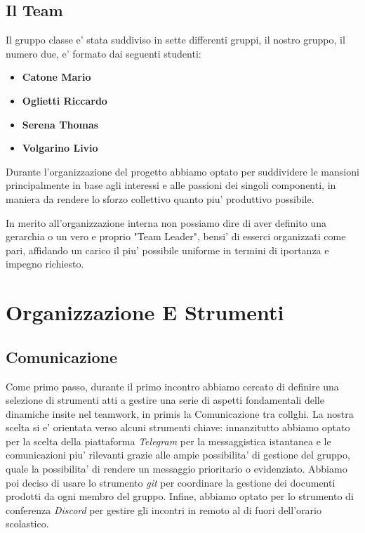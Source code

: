 \documentclass{report}
\begin{document}
		\section{Il Team}
			Il gruppo classe e' stata suddiviso in sette differenti gruppi, il nostro gruppo, il numero due, e' formato dai 
			seguenti studenti:
			\begin{itemize}
				\item \textbf{Catone Mario}
				\item \textbf{Oglietti Riccardo}
				\item \textbf{Serena Thomas}
				\item \textbf{Volgarino Livio}
			\end{itemize}
			Durante l'organizzazione del progetto abbiamo optato per suddividere le mansioni principalmente in base agli
			interessi e alle passioni dei singoli componenti, in maniera da rendere lo sforzo collettivo quanto piu'
			produttivo possibile. 

			In merito all'organizzazione interna non possiamo dire di aver definito una gerarchia o un vero e proprio 
			"Team Leader", bensi' di esserci organizzati come pari, affidando un carico il piu' possibile uniforme in 
			termini di iportanza e impegno richiesto.

	\chapter{Organizzazione E Strumenti}        
		\section{Comunicazione}
			Come primo passo, durante il primo incontro abbiamo cercato di definire una selezione di strumenti atti a 
			gestire una serie di aspetti fondamentali delle dinamiche insite nel teamwork, in primis la Comunicazione
			tra collghi.
			La nostra scelta si e' orientata verso alcuni strumenti chiave: innanzitutto abbiamo optato per la scelta
			della piattaforma \emph{Telegram} per la messaggistica istantanea e le comunicazioni piu' rilevanti grazie
			alle ampie possibilita' di gestione del gruppo, quale la possibilita' di rendere un messaggio prioritario o
			evidenziato. Abbiamo poi deciso di usare lo strumento \emph{git} per coordinare la gestione dei documenti
			prodotti da ogni membro del gruppo. Infine, abbiamo optato per lo strumento di conferenza \emph{Discord} per
			gestire gli incontri in remoto al di fuori dell'orario scolastico.
\end{document}
